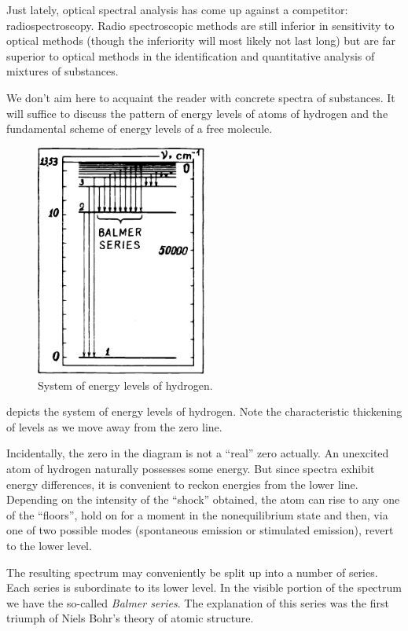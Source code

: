 Just lately, optical spectral analysis has come up against a competitor: radiospectroscopy. Radio spectroscopic methods are still inferior in sensitivity to optical methods (though the inferiority will most likely not last long) but are far superior to optical methods in the identification and quantitative analysis of mixtures of substances.


We don’t aim here to acquaint the reader with concrete spectra of substances. It will suffice to discuss the pattern of energy levels of atoms of hydrogen and the fundamental scheme of energy levels of a free molecule.
\begin{figure}[!ht]
\centering
\includegraphics[width=0.5\textwidth]{figures/fig-01-03.pdf}
\caption{System of energy levels of hydrogen.}
\label{fig-1.3}
\end{figure}

 depicts the system of energy levels of hydrogen. Note the characteristic thickening of levels as we move away from the zero line.

Incidentally, the zero in the diagram is not a ``real'' zero actually. An unexcited atom of hydrogen naturally possesses some energy. But since spectra exhibit energy differences, it is convenient to reckon energies from the lower line. Depending on the intensity of the ``shock'' obtained, the atom can rise to any one of the ``floors'', hold on for a moment in the nonequilibrium state and then, via one of two possible modes (spontaneous emission or stimulated emission), revert to the lower level.

The resulting spectrum may conveniently be split up into a number of series. Each series is subordinate to its lower level. In the visible portion of the spectrum we have the so-called \emph{Balmer series}. The explanation of this series was the first triumph of Niels Bohr's theory of atomic structure.


